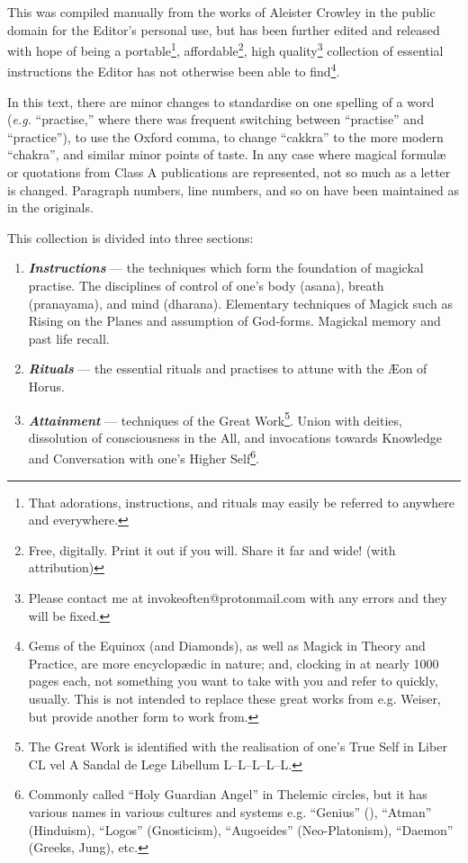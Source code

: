 This was compiled manually from the works of Aleister Crowley in the public domain for the Editor's personal use, but has been further edited and released with hope of being a portable\footnote{That adorations, instructions, and rituals may easily be referred to anywhere and everywhere.}, affordable\footnote{Free\footnotemark, digitally. Print it out if you will. Share it far and wide! (with attribution)}, high quality\footnote{Please contact me at invokeoften@protonmail.com with any errors and they will be fixed.\footnotemark} collection of essential instructions the Editor has not otherwise been able to find\footnote{Gems of the Equinox (and Diamonds), as well as Magick in Theory and Practice, are more encyclop\ae{}dic in nature; and, clocking in at nearly 1000 pages each, not something you want to take with you and refer to quickly, usually. This is not intended to replace these great works from e.g. Weiser, but provide another form to work from.}.

In this text, there are minor changes to standardise on one spelling of a word (\textit{e.g.} \enquote{practise,} where there was frequent switching between \enquote{practise} and \enquote{practice}), to use the Oxford comma, to change \enquote{cakkra} to the more modern \enquote{chakra}, and similar minor points of taste. In any case where magical formul\ae{} or quotations from Class A publications are represented, not so much as a letter is changed. Paragraph numbers, line numbers, and so on have been maintained as in the originals. 

This collection is divided into three sections:

\begin{enumerate}[label=\greek*]
\item \textbf{\textit{Instructions}} --- the techniques which form the foundation of magickal practise. The disciplines of control of one's body (asana), breath (pranayama), and mind (dharana). Elementary techniques of Magick such as Rising on the Planes and assumption of God-forms. Magickal memory and past life recall. 
\item \textbf{\textit{Rituals}} --- the essential rituals and practises to attune with the \AE{}on of Horus. 
\item \textbf{\textit{Attainment}} --- techniques of the Great Work\footnote{The Great Work is identified with the realisation of one's True Self in Liber CL vel  A Sandal de Lege Libellum L--L--L--L--L.}. Union with deities, dissolution of consciousness in the All, and invocations towards Knowledge and Conversation with one's Higher Self\footnote{Commonly called \enquote{Holy Guardian Angel} in Thelemic circles, but it has various names in various cultures and systems e.g. \enquote{Genius} (\GD{}), \enquote{Atman} (Hinduism), \enquote{Logos} (Gnosticism), \enquote{Augoeides} (Neo-Platonism), \enquote{Daemon} (Greeks, Jung), etc.}. 
\end{enumerate}

